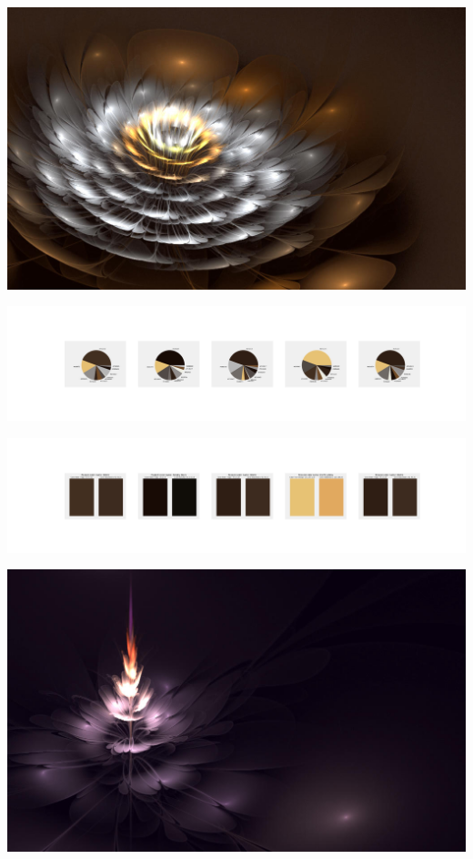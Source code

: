 \documentclass[11pt]{article}
\begin{document}
\begin{landscape}
    \begin{center}
    \includegraphics[width=\textwidth]{./nbimg/file (60).jpg}
    \end{center}

    \begin{center}
    \includegraphics[width=250mm]{./nbimg/pie-408.jpg}
    \end{center}

    \begin{center}
    \includegraphics[width=250mm]{./nbimg/peak-408.jpg}
    \end{center}
    

    \begin{center}
    \includegraphics[width=\textwidth]{./nbimg/file (61).jpg}
    \end{center}


\end{landscape}
\end{document}
